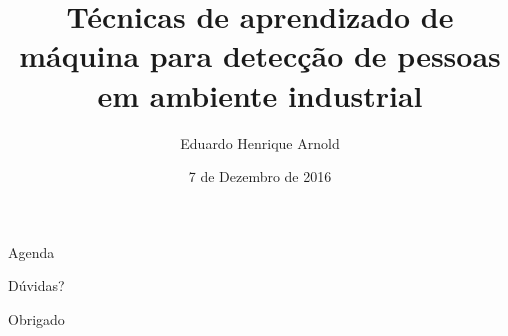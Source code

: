 \documentclass{beamer}
\title{Técnicas de aprendizado de máquina para detecção de pessoas em ambiente industrial}
\date{7 de Dezembro de 2016}
\author{Eduardo Henrique Arnold}
\institute{Universidade Federal de Santa Catarina}
\begin{document}
	\maketitle

	\begin{frame}{Agenda}
		\tableofcontents
	\end{frame}

	
	
	
	
	

	\begin{frame}[standout]
	  Dúvidas?
	\end{frame}

	\begin{frame}[standout]
	  Obrigado
	\end{frame}
\end{document}
